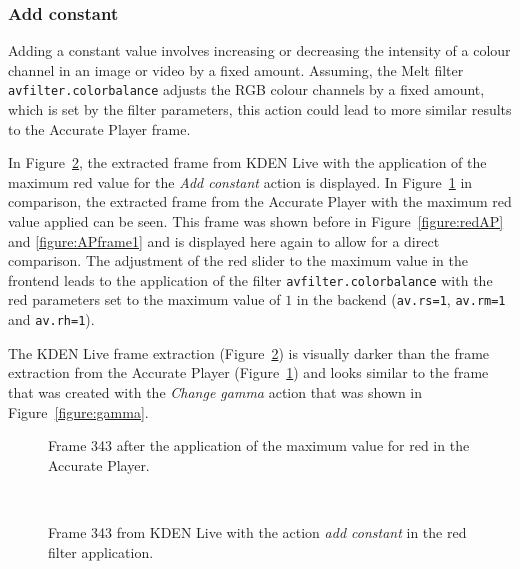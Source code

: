 \documentclass[../MasterThesis.tex]{subfiles}
\begin{document}
\subsubsection*{Add constant}

Adding a constant value involves increasing or decreasing the intensity of a colour channel in an image or video by a fixed amount. Assuming, the Melt filter \texttt{avfilter.colorbalance} adjusts the RGB colour channels by a fixed amount, which is set by the filter parameters, this action could lead to more similar results to the Accurate Player frame.

In Figure~\ref{figure:addconstant}, the extracted frame from KDEN Live with the application of the maximum red value for the \textit{Add constant} action is displayed. 
In Figure~\ref{figure:APframe2} in comparison, the extracted frame from the Accurate Player with the maximum red value applied can be seen. This frame was shown before in Figure~\ref{figure:redAP} and \ref{figure:APframe1} and is displayed here again to allow for a direct comparison. The adjustment of the red slider to the maximum value in the frontend leads to the application of the filter \texttt{avfilter.colorbalance} with the red parameters set to the maximum value of $1$ in the backend (\texttt{av.rs=1}, \texttt{av.rm=1} and \texttt{av.rh=1}).

The KDEN Live frame extraction (Figure~\ref{figure:addconstant}) is visually darker than the frame extraction from the Accurate Player (Figure~\ref{figure:APframe2}) and looks similar to the frame that was created with the \textit{Change gamma} action that was shown in Figure~\ref{figure:gamma}.

\begin{minipage}{0.48\textwidth}
	\begin{figure}[H]
		\begin{center}
			\caption[Frame 343 after the application of the red filter in the Accurate Player.]{Frame 343 after the application of the maximum value for red in the Accurate Player.}
			\label{figure:APframe2}
		\end{center}
	\end{figure}
\end{minipage}\begin{minipage}{0.04\textwidth}
	\ 
\end{minipage}\begin{minipage}{0.48\textwidth}
	\begin{figure}[H]
		\begin{center}
			\caption[Frame 343 from KDEN Live with the action \textit{add constant}.]{Frame 343 from KDEN Live with the action \textit{add constant} in the red filter application.}
			\label{figure:addconstant}
		\end{center}
	\end{figure}
\end{minipage}
\vspace*{1em}
\end{document}
